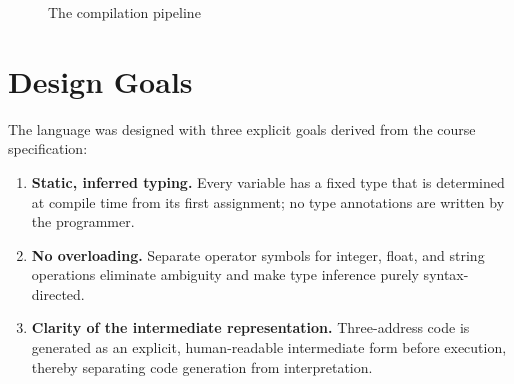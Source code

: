 \documentclass[12pt,a4paper]{report}
\begin{document}
\begin{figure}[H]
\centering
{}
\caption{The compilation pipeline}
\label{fig:pipeline}
\end{figure}

\section{Design Goals}

The language was designed with three explicit goals derived from the course
specification:

\begin{enumerate}
  \item \textbf{Static, inferred typing.} Every variable has a fixed type
        that is determined at compile time from its first assignment; no type
        annotations are written by the programmer.
  \item \textbf{No overloading.} Separate operator symbols for integer, float,
        and string operations eliminate ambiguity and make type inference
        purely syntax-directed.
  \item \textbf{Clarity of the intermediate representation.} Three-address code
        is generated as an explicit, human-readable intermediate form before
        execution, thereby separating code generation from interpretation.
\end{enumerate}
\end{document}
